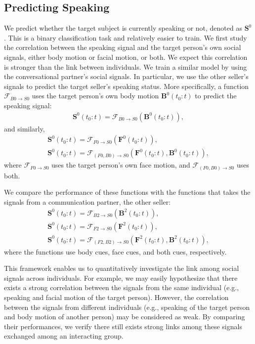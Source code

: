 \subsection{Predicting Speaking}
\label{subsection:ssp_pred_speak}
We predict whether the target subject is currently speaking or not, denoted as $\mathbf{S}^0$.  This is a binary classification task and relatively easier to train. We first study the correlation between the speaking signal and the target person's own social signals, either body motion or facial motion, or both. We expect this correlation is stronger than the link between individuals. We train a similar model by using the conversational partner's social signals. In particular, we use the other seller's signals to predict the target seller's speaking status. More specifically, a function $\mathcal{F}_{B0\rightarrow S0}$ uses the target person's own body motion $\mathbf{B}^0(t_0:t)$ to predict the speaking signal:
\begin{gather}	
\mathbf{S}^0(t_0:t) = \mathcal{F}_{B0\rightarrow S0} \left( \mathbf{B}^0(t_0:t) \right),
\label{eq:speaking_0}
\end{gather}
and similarly,
\begin{gather}	
\mathbf{S}^0(t_0:t) = \mathcal{F}_{F0\rightarrow S0} \left( \mathbf{F}^0(t_0:t) \right),\\
\mathbf{S}^0(t_0:t) = \mathcal{F}_{(F0, B0)\rightarrow S0} \left( \mathbf{F}^0(t_0:t) , \mathbf{B}^0(t_0:t)\right),
\label{eq:speaking_0_facebody}
\end{gather}
where $\mathcal{F}_{F0\rightarrow S0}$ uses the target person's own face motion, and $\mathcal{F}_{(F0, B0)\rightarrow S0}$ uses both. 

We compare the performance of these functions with the functions that takes the signals from a communication partner, the other seller:
\begin{gather}	
\mathbf{S}^0(t_0:t) = \mathcal{F}_{B2\rightarrow S0} \left( \mathbf{B}^2(t_0:t) \right),\\
\mathbf{S}^0(t_0:t) = \mathcal{F}_{F2\rightarrow S0} \left( \mathbf{F}^2(t_0:t) \right),\\
\mathbf{S}^0(t_0:t) = \mathcal{F}_{(F2, B2)\rightarrow S0} \left( \mathbf{F}^2(t_0:t), \mathbf{B}^2(t_0:t) \right),
\label{eq:speaking_1}
\end{gather}
where the functions use body cues, face cues, and both cues, respectively. 

This framework enables us to quantitatively investigate the link among social signals across individuals. For example, we may easily hypothesize that there exists a strong correlation between the signals from the same individual (e.g., speaking and facial motion of the target person). However, the correlation between the signals from different individuals (e.g., speaking of the target person and body motion of another person) may be considered as weak. By comparing their performances, we verify there still exists strong links among these signals exchanged among an interacting group. 

